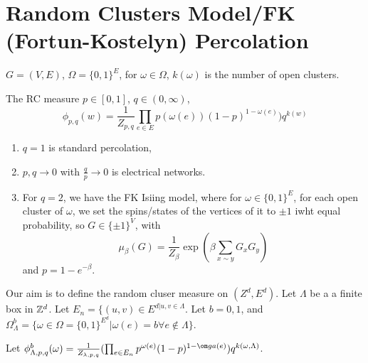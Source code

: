 
\section{Random Clusters Model/FK (Fortun-Kostelyn) Percolation}
\label{sec:rand-clust-modelfk}

\begin{defn}
  \label{defn:random_walks_on_graphs:30}
  $G = (V, E)$, $\Omega = \{ 0, 1 \}^{E}$, for $\omega \in \Omega$,
  $k(\omega)$ is the  number of open clusters.

  The RC measure $p \in [0, 1]$, $q \in (0, \infty)$,
  \begin{equation}
    \label{eq:49}
    \phi_{p, q}(w) = \frac{1}{Z_{p, q}} \prod_{e \in E} p(\omega(e)) (1-p)^{1 -
      \omega(e)})  q^{k(w)}
  \end{equation}
\end{defn}

\begin{enumerate}
\item $q = 1$ is standard percolation,
\item $p, q \rightarrow 0$ with $\frac{q}{p} \rightarrow 0$ is
  electrical networks.
\item For $q = 2$, we have the FK Isiing model, where for $\omega \in
  \{ 0, 1 \}^{E}$, for each open cluster of $\omega$, we set the
  spins/states of the vertices of it to $\pm 1$ iwht equal
  probability, so $G \in \{ \pm 1 \}^{V}$, with
  \begin{equation}
    \label{eq:50}
    \mu_{\beta}(G) = \frac{1}{Z_{\beta}} \exp(\beta \sum_{x \sim y}
    G_{x} G_{y})
  \end{equation} and $p = 1 - e^{-\beta}$.
\end{enumerate}

Our aim is to define the random cluser measure on $(Z^{d}, E^{d})$.
Let $\Lambda$ be a a finite box in $\mathbb{Z}^{d}$.  Let $E_{n} = \{ (u, v)
\in E^{d | u, v \in \Lambda}$.  Let $b = 0, 1$, and
$\Omega_{\Lambda}^{b} = \{ \omega \in \Omega = \{ 0, 1 \}^{E^{d}} |
\omega(e) = b \forall e \notin \Lambda \}$.

Let $\phi_{\Lambda, p, q}^{b}(\omega) = \frac{1}{Z_{\lambda, p,
    q}} (\prod_{e \in E_{n}} p^{\omega(e)} (1-p)^{1 - \om ga(e)})
q^{k(\omega,   \Lambda)}$.


